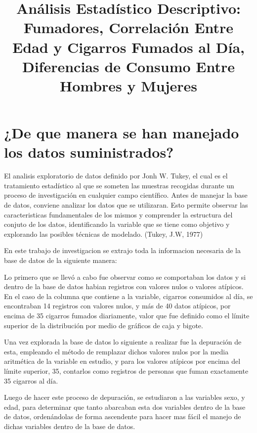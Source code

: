 \documentclass[
  stu,
  longtable,
  nolmodern,
  notxfonts,
  notimes,
  colorlinks=true,linkcolor=blue,citecolor=blue,urlcolor=blue]{apa7}
\title{Análisis Estadístico Descriptivo: Fumadores, Correlación Entre
Edad y Cigarros Fumados al Día, Diferencias de Consumo Entre Hombres y
Mujeres}
\begin{document}
\maketitle


\setcounter{secnumdepth}{-\maxdimen} %

\setlength\LTleft{0pt}


\section{¿De que manera se han manejado los datos
suministrados?}\label{de-que-manera-se-han-manejado-los-datos-suministrados}

El analisis exploratorio de datos definido por Jonh W. Tukey, el cual es
el tratamiento estadístico al que se someten las muestras recogidas
durante un proceso de investigación en cualquier campo científico. Antes
de manejar la base de datos, conviene analizar los datos que se
utilizaran. Esto permite observar las caracteristicas fundamentales de
los mismos y comprender la estructura del conjuto de los datos,
identificando la variable que se tiene como objetivo y explorando las
posibles técnicas de modelado. (Tukey, J.W, 1977)

En este trabajo de investigacion se extrajo toda la informacion
necesaria de la base de datos de la siguiente manera:

Lo primero que se llevó a cabo fue observar como se comportaban los
datos y si dentro de la base de datos habian registros con valores nulos
o valores atípicos. En el caso de la columna que contiene a la variable,
cigarros consumidos al día, se encontraban 14 registros con valores
nulos, y más de 40 datos atípicos, por encima de 35 cigarros fumados
diariamente, valor que fue definido como el límite superior de la
distribución por medio de gráficos de caja y bigote.

Una vez explorada la base de datos lo siguiente a realizar fue la
depuración de esta, empleando el método de remplazar dichos valores
nulos por la media aritmética de la variable en estudio, y para los
valores atípicos por encima del límite superior, 35, contarlos como
registros de personas que fuman exactamente 35 cigarros al día.

Luego de hacer este proceso de depuración, se estudiaron a las variables
sexo, y edad, para determinar que tanto abarcaban esta dos variables
dentro de la base de datos, ordenándolas de forma ascendente para hacer
mas fácil el manejo de dichas variables dentro de la base de datos.
\end{document}
